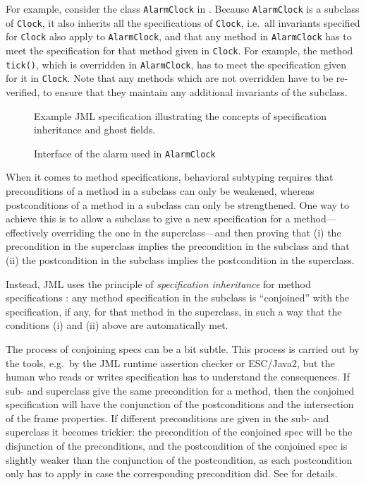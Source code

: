 \documentclass{llncs}
\begin{document}
For example, consider the class \texttt{AlarmClock} in .
Because \texttt{AlarmClock} is a subclass of \texttt{Clock}, it also
inherits all the specifications of \texttt{Clock}, i.e.\ 
all invariants specified for \texttt{Clock} also apply to \texttt{AlarmClock},
and that any method in \texttt{AlarmClock} has to meet the specification
for that method given in  \texttt{Clock}.
For example, the method \texttt{tick()}, which is overridden in \texttt{AlarmClock},
has to meet the specification given for it in \texttt{Clock}. 
Note that any methods which are not overridden have to be re-verified, to ensure 
that they maintain any additional invariants of the subclass.

\begin{figure}[tbp] 
%
%
\vspace*{-2ex} %
\caption{\label{Example:alarmclock}Example JML specification illustrating the concepts of 
specification inheritance and ghost fields.}
\end{figure}

\begin{figure}[tbp] \label{Example:alarminterface}
%
%
\vspace*{-2ex} %
\caption{Interface of the alarm used in \texttt{AlarmClock}}
\end{figure}

When it comes to method specifications, behavioral subtyping requires
that preconditions of a method in a subclass can only  be weakened,
whereas postconditions of a method in a subclass can only  be strengthened.
One way to achieve this is to allow a subclass to give a new specification
for a method---effectively overriding the one in the superclass---and 
then proving that (i) the precondition in the superclass implies the
precondition in the subclass and that (ii) the postcondition in the subclass
implies the postcondition in the superclass.

Instead, JML uses the principle of \emph{specification inheritance} 
for method specifications \cite{Dhara-Leavens96}: any method specification
in the subclass is ``conjoined'' with the specification, if any, for that
method in the superclass, in such a way that the conditions (i) and (ii) above 
are automatically met.

The process of conjoining specs can be a bit subtle. This process is carried 
out by the tools, e.g.\ by the JML runtime assertion checker or ESC/Java2, 
but the human who reads or writes specification has to understand the 
consequences.  If sub- and superclass
give the same precondition for a method, then the conjoined specification will
have the conjunction of the postconditions and the intersection of the frame
properties.  If different preconditions are given in the sub- and superclass it
becomes trickier: the precondition of the conjoined spec will be the
disjunction of the preconditions, and the postcondition of the conjoined spec
is slightly weaker than the conjunction of the postcondition, as each
postcondition only has to apply in case the corresponding precondition did.
See \cite{Dhara-Leavens96} for details.
\end{document}
